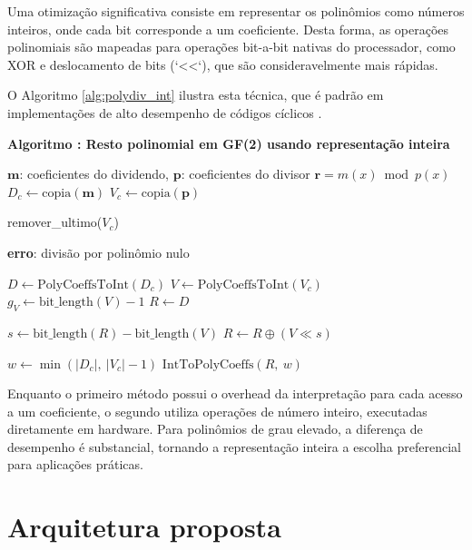 Uma otimização significativa consiste em representar os polinômios como números inteiros, onde cada bit corresponde a um coeficiente.
Desta forma, as operações polinomiais são mapeadas para operações bit-a-bit nativas do processador, como XOR e deslocamento de bits (`<<`), que são consideravelmente mais rápidas.

O Algoritmo \ref{alg:polydiv_int} ilustra esta técnica, que é padrão em implementações de alto desempenho de códigos cíclicos \cite{peterson1961cyclic}.

\begin{algorithm}[H]
\textbf{Algoritmo \thealgorithm: Resto polinomial em GF(2) usando representação inteira}\label{alg:polydiv_int}\par\smallskip
\begin{algorithmic}[1]
\Require $\mathbf{m}$: coeficientes do dividendo, $\mathbf{p}$: coeficientes do divisor
\Ensure $\mathbf{r} = m(x) \bmod p(x)$
\State $D_c \gets \text{copia}(\mathbf{m})$
\State $V_c \gets \text{copia}(\mathbf{p})$

    \State remover\_ultimo($V_c$)
\EndWhile

    \State \textbf{erro}: divisão por polinômio nulo
\EndIf

\State $D \gets \text{PolyCoeffsToInt}(D_c)$
\State $V \gets \text{PolyCoeffsToInt}(V_c)$
\State $g_V \gets \text{bit\_length}(V) - 1$
\State $R \gets D$

    \State $s \gets \text{bit\_length}(R) - \text{bit\_length}(V)$
    \State $R \gets R \oplus (V \ll s)$
\EndWhile

\State $w \gets \min(|D_c|,\ |V_c|-1)$
\State \Return $\text{IntToPolyCoeffs}(R,\ w)$
\end{algorithmic}
\end{algorithm}

Enquanto o primeiro método possui o overhead da interpretação para cada acesso a um coeficiente, o segundo utiliza operações de número inteiro, executadas diretamente em hardware. Para polinômios de grau elevado, a diferença 
de desempenho é substancial, tornando a representação inteira a escolha preferencial para aplicações práticas.

\section{Arquitetura proposta}%

